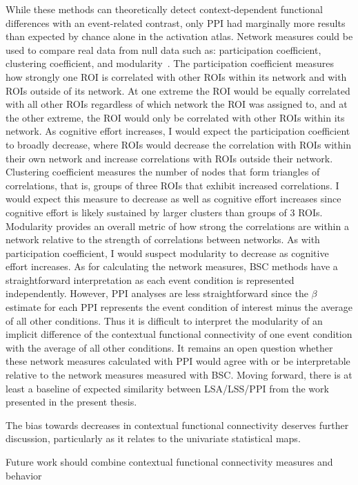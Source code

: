 \documentclass[phd,appendix,figures]{uithesis}
\begin{document}
While these methods can theoretically detect context-dependent functional differences with an event-related
contrast, only PPI had marginally more results than expected by chance alone in the activation atlas.
Network measures could be used to compare real data from null data such as: participation coefficient,
clustering coefficient, and modularity~\cite{Rubinov2010}.
The participation coefficient measures how strongly one ROI is correlated with other ROIs within its
network and with ROIs outside of its network.
At one extreme the ROI would be equally correlated with all other ROIs regardless of which network the
ROI was assigned to, and at the other extreme, the ROI would only be correlated with other ROIs within its
network.
As cognitive effort increases, I would expect the participation coefficient to broadly decrease, where ROIs
would decrease the correlation with ROIs within their own network and increase correlations with ROIs outside
their network.
Clustering coefficient measures the number of nodes that form triangles of correlations, that is, groups of three
ROIs that exhibit increased correlations.
I would expect this measure to decrease as well as cognitive effort increases since cognitive effort is likely
sustained by larger clusters than groups of 3 ROIs.
Modularity provides an overall metric of how strong the correlations are within a network relative to the strength
of correlations between networks.
As with participation coefficient, I would suspect modularity to decrease as cognitive effort increases.
As for calculating the network measures, BSC methods have a straightforward interpretation as each
event condition is represented independently.
However, PPI analyses are less straightforward since the $\beta$ estimate for each PPI represents
the event condition of interest minus the average of all other conditions.
Thus it is difficult to interpret the modularity of an implicit difference of the contextual functional connectivity
of one event condition with the average of all other conditions.
It remains an open question whether these network measures calculated with PPI would agree with or be interpretable relative
to the network measures measured with BSC.
Moving forward, there is at least a baseline of expected similarity between LSA/LSS/PPI from the work presented
in the present thesis.

The bias towards decreases in contextual functional connectivity deserves further discussion,
particularly as it relates to the univariate statistical maps.

Future work should combine contextual functional connectivity measures and behavior
\end{document}
